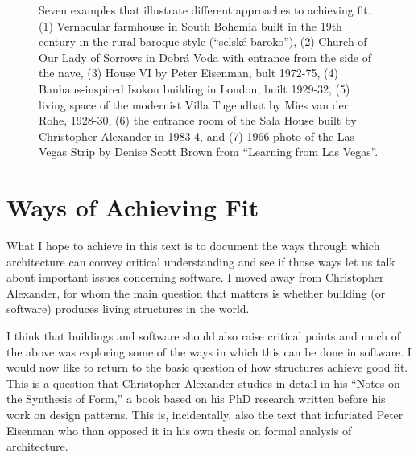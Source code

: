\begin{figure}[t]
\caption{Seven examples that illustrate different approaches to achieving fit.
(1) Vernacular farmhouse in South Bohemia built in the 19th century in the rural baroque style (``selské baroko''),
(2) Church of Our Lady of Sorrows in Dobrá Voda with entrance from the side of the nave,
(3) House VI by Peter Eisenman, bult 1972-75,
(4) Bauhaus-inspired Isokon building in London, built 1929-32,
(5) living space of the modernist Villa Tugendhat by Mies van der Rohe, 1928-30,
(6) the entrance room of the Sala House built by Christopher Alexander in 1983-4, and
(7) 1966 photo of the Las Vegas Strip by Denise Scott Brown from ``Learning from Las Vegas''.}
\label{fig:fit}
\end{figure}

\section{Ways of Achieving Fit}
What I hope to achieve in this text is to document the ways through which architecture can convey
critical understanding and see if those ways let us talk about important issues concerning software. I moved
away from Christopher Alexander, for whom the main question that matters is whether building (or software)
produces living structures in the world.

I think that buildings and software should also raise critical points and much of the above was
exploring some of the ways in which this can be done in software. I would now like to return
to the basic question of how structures achieve good fit. This is a question that Christopher
Alexander studies in detail in his ``Notes on the Synthesis of Form,'' a book based
on his PhD research written before his work on design patterns. This is, incidentally,
also the text that infuriated Peter Eisenman who than opposed it in his own thesis on formal
analysis of architecture.

